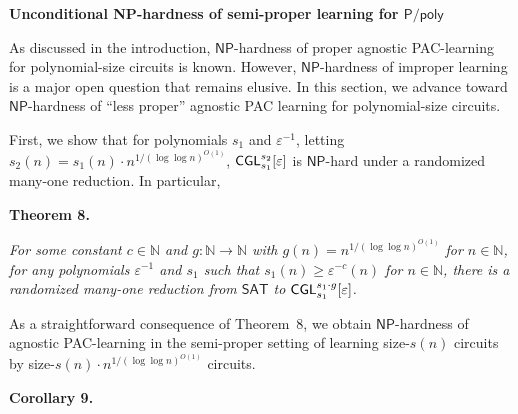 \documentclass[10pt,a4paper]{article}
\begin{document}
\par\medskip\noindent\textbf{Unconditional NP-hardness of semi-proper learning for ${\mathsf{P}}/{\mathsf{poly}}$
}\par




As discussed in the introduction, ${\mathsf{NP}}$-hardness of proper agnostic PAC-learning for polynomial-size circuits is known. However, ${\mathsf{NP}}$-hardness of improper learning is a major open question that remains elusive. In this section, we advance toward ${\mathsf{NP}}$-hardness of “less proper” agnostic PAC learning for polynomial-size circuits.\par




First, we show that for polynomials $s_{1}$ and $\varepsilon^{-1}$, letting $s_{2}(n)=s_{1}(n)\cdot n^{1/(\log\log n)^{O(1)}}$, ${\sf CGL}_{s_{1}}^{s_{2}}[\varepsilon]$ is ${\mathsf{NP}}$-hard under a randomized many-one reduction. In particular,\par





\par\medskip\noindent\textbf{
\textbf{Theorem 8}\textbf{.}
}\par



\emph{For some constant $c\in\mathbb{N}$ and $g:\mathbb{N}\to\mathbb{N}$ with $g(n)=n^{1/(\log\log n)^{O(1)}}$ for $n\in\mathbb{N}$, for any polynomials $\varepsilon^{-1}$ and $s_{1}$ such that $s_{1}(n)\geq\varepsilon^{-c}(n)$ for $n\in\mathbb{N}$, there is a randomized many-one reduction from ${\mathsf{SAT}}$ to ${\sf CGL}_{s_{1}}^{s_{1}\cdot g}[\varepsilon]$.}\par






As a straightforward consequence of Theorem 8, we obtain ${\mathsf{NP}}$-hardness of agnostic PAC-learning in the semi-proper setting of learning size-$s(n)$ circuits by size-$s(n)\cdot n^{1/(\log\log n)^{O(1)}}$ circuits.\par





\par\medskip\noindent\textbf{
\textbf{Corollary 9}\textbf{.}
}\par
\end{document}
